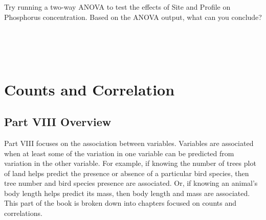 \documentclass[
  openany]{scrbook}
\begin{document}
\begin{verbatim}





\end{verbatim}

Try running a two-way ANOVA to test the effects of Site and Profile on Phosphorus concentration.
Based on the ANOVA output, what can you conclude?

\begin{verbatim}




\end{verbatim}

\hypertarget{part-counts-and-correlation}{%
\part{Counts and Correlation}\label{part-counts-and-correlation}}

\hypertarget{Week9}{%
\chapter*{Part VIII Overview}\label{Week9}}

Part VIII focuses on the association between variables.
Variables are associated when at least some of the variation in one variable can be predicted from variation in the other variable.
For example, if knowing the number of trees plot of land helps predict the presence or absence of a particular bird species, then tree number and bird species presence are associated.
Or, if knowing an animal's body length helps predict its mass, then body length and mass are associated.
This part of the book is broken down into chapters focused on counts and correlations.
\end{document}
